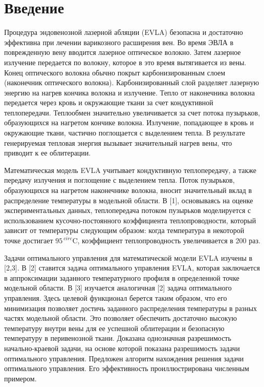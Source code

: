 
    \section{Введение}
    Процедура эндовенозной лазерной абляции (EVLA) безопасна и достаточно эффективна при
    лечении варикозного расширения вен.
    Во время ЭВЛА в поврежденную вену вводится лазерное оптическое волокно.
    Затем лазерное излучение передается по волокну, которое в это время вытягивается из вены.
    Конец оптического волокна обычно покрыт карбонизированным слоем (наконечник оптического волокна).
    Карбонизированный слой разделяет лазерную энергию на нагрев кончика волокна и излучение.
    Тепло от наконечника волокна передается через кровь и окружающие ткани за счет кондуктивной теплопередачи.
    Теплообмен значительно увеличивается за счет потока пузырьков, образующихся на нагретом кончике волокна.
    Излучение, попадающее в кровь и окружающие ткани, частично поглощается с выделением тепла.
    В результате генерируемая тепловая энергия вызывает значительный нагрев вены, что приводит к ее облитерации.


    Математическая модель EVLA учитывает кондуктивную теплопередачу, а также передачу излучения
    и поглощение с выделением тепла.
    Поток пузырьков, образующихся на нагретом наконечнике волокна,
    вносит значительный вклад в распределение температуры в модельной области.
    В [1], основываясь на оценке экспериментальных данных, теплопередача потоком пузырьков моделируется
    с использованием кусочно-постоянного коэффициента теплопроводности, который зависит от температуры
    следующим образом: когда температура в некоторой точке достигает $95 ^ {\ circ} \mathrm {C}$,
    коэффициент теплопроводность увеличивается в 200 раз.


    Задачи оптимального управления для математической модели EVLA изучены в [2,3].
    В [2] ставится задача оптимального управления EVLA, которая заключается в
    аппроксимации заданного температурного профиля в определенной точке модельной области.
    В [3] изучается аналогичная [2] задача оптимального управления.
    Здесь целевой функционал берется таким образом, что его минимизация позволяет достичь
    заданного распределения температуры в разных частях модельной области.
    Это позволяет обеспечить достаточно высокую температуру внутри вены для ее успешной
    облитерации и безопасную температуру в перивенозной ткани.
    Доказана однозначная разрешимость начально-краевой задачи,
    на основе которой показана разрешимость задачи оптимального управления.
    Предложен алгоритм нахождения решения задачи оптимального управления.
    Его эффективность проиллюстрирована численным примером.


